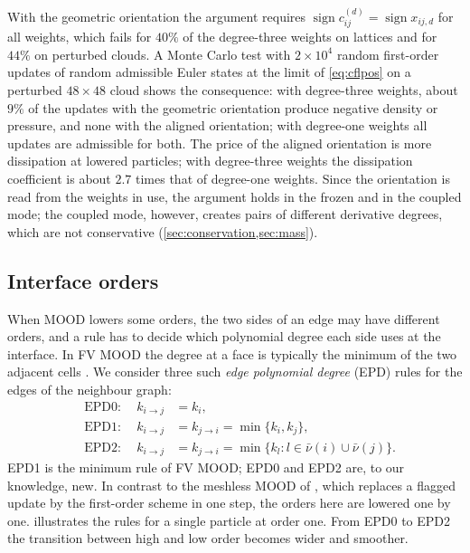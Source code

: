 \documentclass[11pt,a4paper]{article}
\numberwithin{equation}{section}
\newcommand{\cnb}{\bar\nu}
\newcommand{\sgn}{\operatorname{sign}}
\newcommand{\ord}[2]{k_{#1\to #2}}
\begin{document}
With the geometric orientation the argument requires $\sgn c^{(d)}_{ij}=\sgn x_{ij,d}$ for all weights, which fails for $40\%$ of the degree-three weights on lattices and for $44\%$ on perturbed clouds. A Monte Carlo test with $2\times10^4$ random first-order updates of random admissible Euler states at the limit of \eqref{eq:cflpos} on a perturbed $48\times48$ cloud shows the consequence: with degree-three weights, about $9\%$ of the updates with the geometric orientation produce negative density or pressure, and none with the aligned orientation; with degree-one weights all updates are admissible for both. The price of the aligned orientation is more dissipation at lowered particles; with degree-three weights the dissipation coefficient is about $2.7$ times that of degree-one weights. Since the orientation is read from the weights in use, the argument holds in the frozen and in the coupled mode; the coupled mode, however, creates pairs of different derivative degrees, which are not conservative (\cref{sec:conservation,sec:mass}).

\subsection{Interface orders}\label{sec:epd}

When MOOD lowers some orders, the two sides of an edge may have different orders, and a rule has to decide which polynomial degree each side uses at the interface. In FV MOOD the degree at a face is typically the minimum of the two adjacent cells \cite{Clain2011,Diot2012}. We consider three such \emph{edge polynomial degree} (EPD) rules for the edges of the neighbour graph:
\begin{equation}\label{eq:epd}
\begin{aligned}
&\text{EPD0:}&\ \ \ord ij&=k_i,\\
&\text{EPD1:}&\ \ \ord ij&=\ord ji=\min\{k_i,k_j\},\\
&\text{EPD2:}&\ \ \ord ij&=\ord ji=\min\{k_l: l\in\cnb(i)\cup\cnb(j)\}.
\end{aligned}
\end{equation}
EPD1 is the minimum rule of FV MOOD; EPD0 and EPD2 are, to our knowledge, new. In contrast to the meshless MOOD of \cite{Willems2025}, which replaces a flagged update by the first-order scheme in one step, the orders here are lowered one by one.  illustrates the rules for a single particle at order one. From EPD0 to EPD2 the transition between high and low order becomes wider and smoother.
\end{document}
